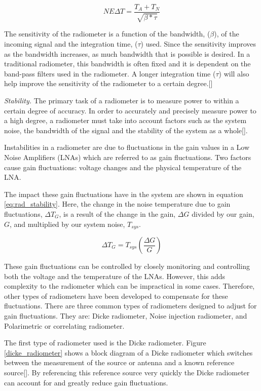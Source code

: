 \begin{equation} \label{NEAT_EQ}
NE\Delta T=\frac{T_{A}+T_{N}}{\sqrt{\beta * \tau}} 
\end{equation}

The sensitivity of the radiometer is a function of the bandwidth, ($\beta$), of the incoming signal and the integration time, ($\tau$) used.  Since the sensitivity improves as the bandwidth increases, as much bandwidth that is possible is desired.  In a traditional radiometer, this bandwidth is often fixed and it is dependent on the band-pass filters used in the radiometer.  A longer integration time ($\tau$) will also help improve the sensitivity of the radiometer to a certain degree.[\cite{ulaby}]

\emph{Stability.}  The primary task of a radiometer is to measure power to within a certain degree of accuracy.  In order to accurately and precisely measure power to a high degree, a radiometer must take into account factors such as the system noise, the bandwidth of the signal and the stability of the system as a whole[\cite{Evans}]. 

Instabilities in a radiometer are due to fluctuations in the gain values in a Low Noise Amplifiers (LNAs) which are referred to as gain fluctuations.  Two factors cause gain fluctuations: voltage changes and the physical temperature of the LNA.  

The impact these gain fluctuations have in the system are shown in equation \ref{eq:rad_stability}.  Here, the change in the noise temperature due to gain fluctuations, $\Delta T_{G}$, is a result of the change in the gain, $\Delta G$ divided by our gain, $G$, and multiplied by our system noise, $T_{sys}$.  

\begin{equation} \label{eq:rad_stability}
\Delta T_G=T_{sys} \left(\frac{\Delta G}{G}\right)
\end{equation}

These gain fluctuations can be controlled by closely monitoring and controlling both the voltage and the temperature of the LNAs. However, this adds complexity to the radiometer which can be impractical in some cases.  Therefore, other types of radiometers have been developed to compensate for these fluctuations.  There are three common types of radiometers designed to adjust for gain fluctuations.  They are: Dicke radiometer, Noise injection radiometer, and Polarimetric or correlating radiometer.

The first type of radiometer used is the Dicke radiometer.  Figure \ref{dicke_radiometer} shows a block diagram of a Dicke radiometer which switches between the measurement of the source or antenna and a known reference source[\cite{Dicke}].  By referencing this reference source very quickly the Dicke radiometer can account for and greatly reduce gain fluctuations.  

